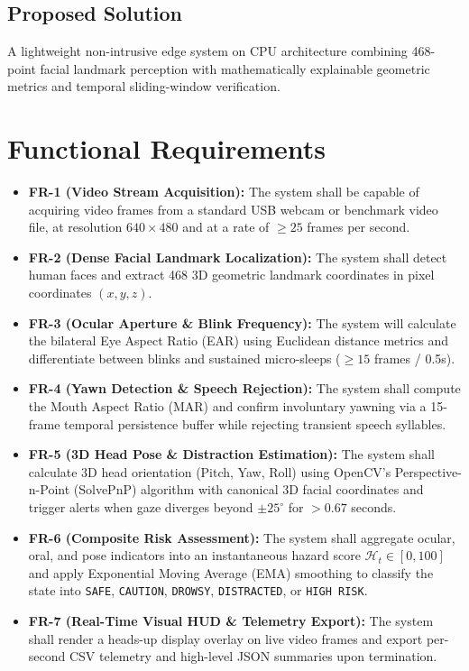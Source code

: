 \documentclass[11pt,a4paper]{article}
\begin{document}
\subsection{Proposed Solution}
A lightweight non-intrusive edge system on CPU architecture combining 468-point facial landmark perception with mathematically explainable geometric metrics and temporal sliding-window verification.

\section{Functional Requirements}
\begin{itemize}
    \item \textbf{FR-1 (Video Stream Acquisition):} The system shall be capable of acquiring video frames from a standard USB webcam or benchmark video file, at resolution $640 \times 480$ and at a rate of $\ge 25$ frames per second.
    \item \textbf{FR-2 (Dense Facial Landmark Localization):} The system shall detect human faces and extract 468 3D geometric landmark coordinates in pixel coordinates $(x, y, z)$.
    \item \textbf{FR-3 (Ocular Aperture \& Blink Frequency):} The system will calculate the bilateral Eye Aspect Ratio (EAR) using Euclidean distance metrics and differentiate between blinks and sustained micro-sleeps ($\ge 15$ frames / 0.5s).
    \item \textbf{FR-4 (Yawn Detection \& Speech Rejection):} The system shall compute the Mouth Aspect Ratio (MAR) and confirm involuntary yawning via a 15-frame temporal persistence buffer while rejecting transient speech syllables.
    \item \textbf{FR-5 (3D Head Pose \& Distraction Estimation):} The system shall calculate 3D head orientation (Pitch, Yaw, Roll) using OpenCV's Perspective-n-Point (SolvePnP) algorithm with canonical 3D facial coordinates and trigger alerts when gaze diverges beyond $\pm 25^\circ$ for $> 0.67$ seconds.
    \item \textbf{FR-6 (Composite Risk Assessment):} The system shall aggregate ocular, oral, and pose indicators into an instantaneous hazard score $\mathcal{H}_t \in [0, 100]$ and apply Exponential Moving Average (EMA) smoothing to classify the state into \texttt{SAFE}, \texttt{CAUTION}, \texttt{DROWSY}, \texttt{DISTRACTED}, or \texttt{HIGH RISK}.
    \item \textbf{FR-7 (Real-Time Visual HUD \& Telemetry Export):} The system shall render a heads-up display overlay on live video frames and export per-second CSV telemetry and high-level JSON summaries upon termination.
\end{itemize}
\end{document}
